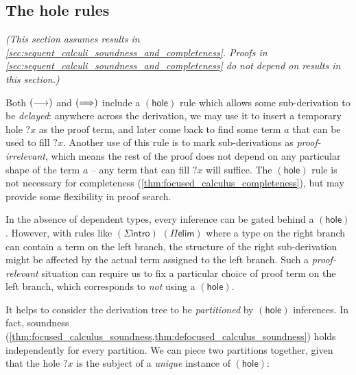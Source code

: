 \documentclass[twoside]{report}
\begin{document}
\subsection*{The hole rules}

\emph{(This section assumes results in \cref{sec:sequent_calculi_soundness_and_completeness}. Proofs in \cref{sec:sequent_calculi_soundness_and_completeness} do not depend on results in this section.)}

Both $(\longrightarrow)$ and $(\Longrightarrow)$ include a $(\mathsf{hole})$ rule which allows some sub-derivation to be \emph{delayed}: anywhere across the derivation, we may use it to insert a temporary hole ${?x}$ as the proof term, and later come back to find some term $a$ that can be used to fill ${?x}$. Another use of this rule is to mark sub-derivations as \emph{proof-irrelevant}, which means the rest of the proof does not depend on any particular shape of the term $a$ -- any term that can fill ${?x}$ will suffice. The $(\mathsf{hole})$ rule is not necessary for completeness (\cref{thm:focused_calculus_completeness}), but may provide some flexibility in proof search.

In the absence of dependent types, every inference can be gated behind a $(\mathsf{hole})$. However, with rules like $(\Sigma\mathsf{intro})$ $(\Pi\mathsf{elim})$ where a type on the right branch can contain a term on the left branch, the structure of the right sub-derivation might be affected by the actual term assigned to the left branch. Such a \emph{proof-relevant} situation can require us to fix a particular choice of proof term on the left branch, which corresponds to \emph{not} using a $(\mathsf{hole})$.

It helps to consider the derivation tree to be \emph{partitioned} by $(\mathsf{hole})$ inferences. In fact, soundness (\cref{thm:focused_calculus_soundness,thm:defocused_calculus_soundness}) holds independently for every partition. We can piece two partitions together, given that the hole ${?x}$ is the subject of a \emph{unique} instance of $(\mathsf{hole})$:
\end{document}
